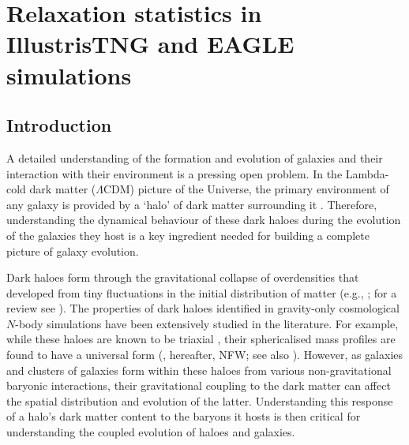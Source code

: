 \chapter{Relaxation statistics in IllustrisTNG and EAGLE simulations}
\section{Introduction}
\label{sec:intro-ch:simbase}
\noindent
A detailed understanding of the formation and evolution of galaxies and their interaction with their environment is a pressing open problem. 
In the Lambda-cold dark matter ($\Lambda$CDM) picture of the Universe, the primary environment of any galaxy is provided by a `halo' of dark matter surrounding it \citep[e.g.,][]{wr78}. 
Therefore, understanding the dynamical behaviour of these dark haloes during the evolution of the galaxies they host is a key ingredient needed for building a complete picture of galaxy evolution.

Dark haloes form through the gravitational collapse of overdensities that developed from tiny fluctuations in the initial distribution of matter (e.g., \citealp[][]{1974ApJ...187..425P}; for a review see \citealp{2002PhR...372....1C}). 
The properties of dark haloes identified in gravity-only cosmological $N$-body simulations have been extensively studied in the literature. For example, while these haloes are known to be triaxial \citep[][]{1988ApJ...327..507F}, their sphericalised mass profiles are found to have a universal form (\citealp{1996ApJ...462..563N,1997ApJ...490..493N}, hereafter, NFW; see also \citealp{2010MNRAS.402...21N}). 
However, as galaxies and clusters of galaxies form within these haloes from various non-gravitational baryonic interactions, their gravitational coupling to the dark matter can affect the spatial distribution and evolution of the latter. Understanding this response of a halo's dark matter content to the baryons it hosts is then critical for understanding the coupled evolution of haloes and galaxies. 

